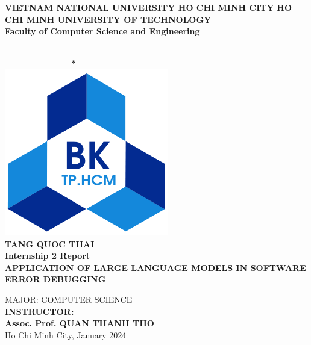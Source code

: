\documentclass[a4paper,oneside]{book}
\begin{document}
\begin{titlepage}
\thispagestyle{empty}
\usetikzlibrary{calc}

\begin{center}
	\begin{large}
		{\fontsize{12pt}{1}\textbf{VIETNAM NATIONAL UNIVERSITY HO CHI MINH CITY}}
		\textbf{HO CHI MINH UNIVERSITY OF TECHNOLOGY} \\
		\textbf{Faculty of Computer Science and Engineering}
	\end{large} \\
	\textbf{--------------------  *  ---------------------}\\

	\vspace{0.8cm}
	\includegraphics[scale=.35]{img/hcmut.png}\\
	\vspace{0.8cm}
	{\fontsize{14.4pt}{1}\selectfont \textbf{TANG QUOC THAI}}\\[.75cm]
	\vspace{0.8cm}
	{\fontsize{14.4pt}{1}\selectfont \textbf{Internship 2 Report}}\\[.75cm]
	{\fontsize{17pt}{1}\selectfont \textbf{\MakeUppercase{APPLICATION OF LARGE LANGUAGE MODELS IN SOFTWARE ERROR DEBUGGING}}}
\end{center}
\vspace{.4cm}

\begin{center}
	{\fontsize{14.4pt}{1} MAJOR: COMPUTER SCIENCE}\\[.2cm]
    {\fontsize{14.4pt}{1}
    \textbf{INSTRUCTOR:}\\[.2cm]
    \textbf{Assoc. Prof. QUAN THANH THO}\\[.2cm]
    {\fontsize{14.4pt}{1} Ho Chi Minh City, January 2024}}
\end{center}
\end{titlepage}
\end{document}
